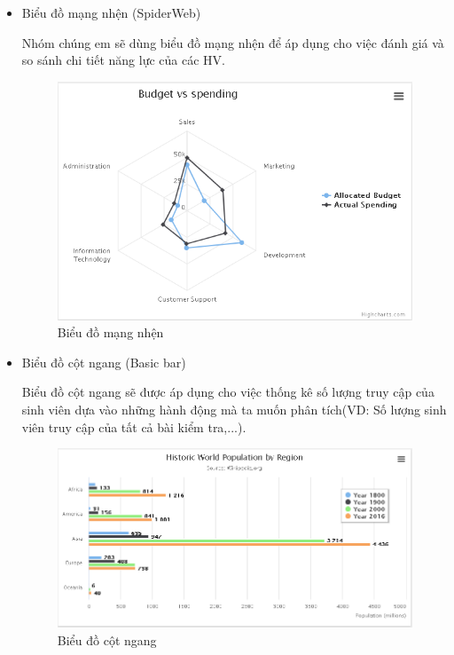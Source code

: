 \begin{itemize}
	\item Biểu đồ mạng nhện (SpiderWeb)
	
	Nhóm chúng em sẽ dùng biểu đồ mạng nhện để áp dụng cho việc đánh giá và so sánh chi tiết năng lực của các HV.
	\begin{center}
		\begin{figure}[htp]
			\begin{center}
				\includegraphics[scale=1]{img/radar}
			\end{center}
			\caption{Biểu đồ mạng nhện}
			\label{refhinh16}
		\end{figure}
	\end{center}
	
	\newpage
	\item Biểu đồ cột ngang (Basic bar)
	
	Biểu đồ cột ngang sẽ được áp dụng cho việc thống kê số lượng truy cập của sinh viên dựa vào những hành động mà ta muốn phân tích(VD: Số lượng sinh viên truy cập của tất cả bài kiểm tra,...).
	
	\begin{center}
		\begin{figure}[htp]
			\begin{center}
				\includegraphics[scale=0.7]{img/bar}
			\end{center}
			\caption{Biểu đồ cột ngang}
			\label{refhinh17}
		\end{figure}
	\end{center}
	

\end{itemize}
